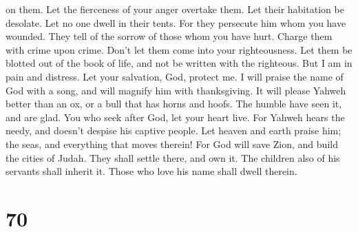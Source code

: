 on them. Let the fierceness of your anger overtake them. 
Let their habitation be desolate. Let no one dwell in their tents.
 For they persecute him whom you have wounded. They tell of
the sorrow of those whom you have hurt.  Charge them with
crime upon crime. Don't let them come into your righteousness.
 Let them be blotted out of the book of life, and not be
written with the righteous.  But I am in pain and distress.
Let your salvation, God, protect me.  I will praise the
name of God with a song, and will magnify him with thanksgiving.
 It will please Yahweh better than an ox, or a bull that
has horns and hoofs.  The humble have seen it, and are
glad. You who seek after God, let your heart live.  For
Yahweh hears the needy, and doesn't despise his captive people.
 Let heaven and earth praise him; the seas, and everything
that moves therein!  For God will save Zion, and build the
cities of Judah. They shall settle there, and own it.  The
children also of his servants shall inherit it. Those who love his name
shall dwell therein.

\hypertarget{section-68}{%
\section{70}\label{section-68}}

